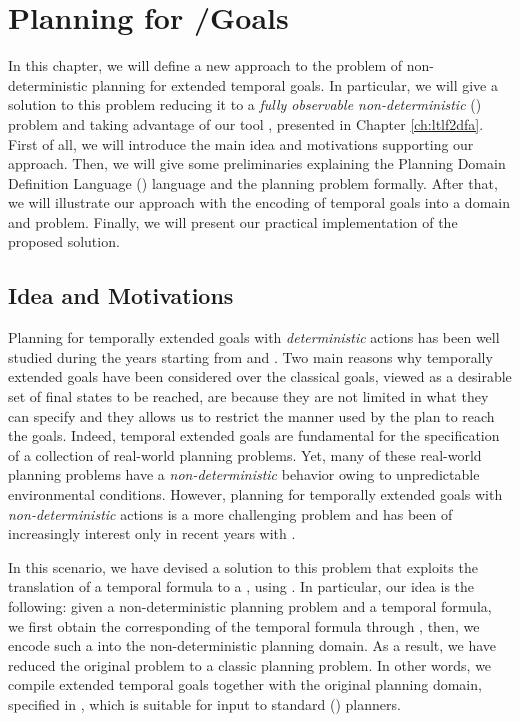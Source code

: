 \chapter{Planning for \LTLf/\PLTL Goals}\label{ch:planning}
In this chapter, we will define a new approach to the problem of non-deterministic planning for extended temporal goals. In particular, we will give a solution to this problem reducing it to a \textit{fully observable non-deterministic} (\FOND) problem and taking advantage of our tool \LTLfToDFA, presented in Chapter \ref{ch:ltlf2dfa}. First of all, we will introduce the main idea and motivations supporting our approach. Then, we will give some preliminaries explaining the Planning Domain Definition Language (\PDDL) language and the \FOND planning problem formally. After that, we will illustrate our \FONDFOR approach with the encoding of temporal goals into a \PDDL domain and problem. Finally, we will present our practical implementation of the proposed solution.
\section{Idea and Motivations}\label{sec:plan-idea-motiv}
Planning for temporally extended goals with \textit{deterministic} actions has been well studied during the years starting from \citep{bacchus1998planning} and \citep{doherty2001talplanner}. Two main reasons why temporally extended goals have been considered over the classical goals, viewed as a desirable set of final states to be reached, are because they are not limited in what they can specify and they allows us to restrict the manner used by the plan to reach the goals. Indeed, temporal extended goals are fundamental for the specification of a collection of real-world planning problems. Yet, many of these real-world planning problems have a \textit{non-deterministic} behavior owing to unpredictable environmental conditions. However, planning for temporally extended goals with \textit{non-deterministic} actions is a more challenging problem and has been of increasingly interest only in recent years with \citep{camacho2017non, de2018automata}.

In this scenario, we have devised a solution to this problem that exploits the translation of a temporal formula to a \DFA, using \LTLfToDFA. In particular, our idea is the following: given a non-deterministic planning problem and a temporal formula, we first obtain the corresponding \DFA of the temporal formula through \LTLfToDFA, then, we encode such a \DFA into the non-deterministic planning domain. As a result, we have reduced the original problem to a classic \FOND planning problem. In other words, we compile extended temporal goals together with the original planning domain, specified in \PDDL, which is suitable for input to standard (\FOND) planners.
